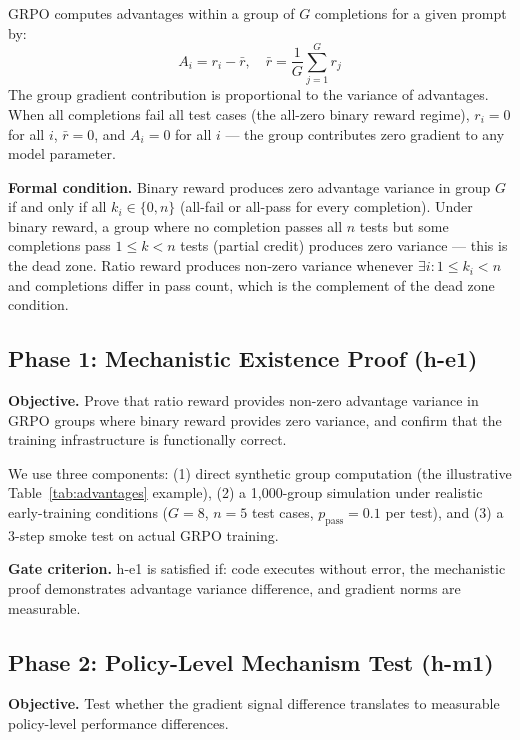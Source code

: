 GRPO computes advantages within a group of $G$ completions for a given prompt by:
\begin{equation}
A_i = r_i - \bar{r}, \quad \bar{r} = \frac{1}{G} \sum_{j=1}^{G} r_j
\end{equation}
The group gradient contribution is proportional to the variance of advantages. When all completions fail all test cases (the all-zero binary reward regime), $r_i = 0$ for all $i$, $\bar{r} = 0$, and $A_i = 0$ for all $i$ --- the group contributes zero gradient to any model parameter.

\textbf{Formal condition.} Binary reward produces zero advantage variance in group $G$ if and only if all $k_i \in \{0, n\}$ (all-fail or all-pass for every completion). Under binary reward, a group where no completion passes all $n$ tests but some completions pass $1 \leq k < n$ tests (partial credit) produces zero variance --- this is the dead zone. Ratio reward produces non-zero variance whenever $\exists i: 1 \leq k_i < n$ and completions differ in pass count, which is the complement of the dead zone condition.

\subsection{Phase 1: Mechanistic Existence Proof (h-e1)}

\textbf{Objective.} Prove that ratio reward provides non-zero advantage variance in GRPO groups where binary reward provides zero variance, and confirm that the training infrastructure is functionally correct.

We use three components: (1) direct synthetic group computation (the illustrative Table~\ref{tab:advantages} example), (2) a 1,000-group simulation under realistic early-training conditions ($G=8$, $n=5$ test cases, $p_{\text{pass}}=0.1$ per test), and (3) a 3-step smoke test on actual GRPO training.

\textbf{Gate criterion.} h-e1 is satisfied if: code executes without error, the mechanistic proof demonstrates advantage variance difference, and gradient norms are measurable.

\subsection{Phase 2: Policy-Level Mechanism Test (h-m1)}

\textbf{Objective.} Test whether the gradient signal difference translates to measurable policy-level performance differences.

